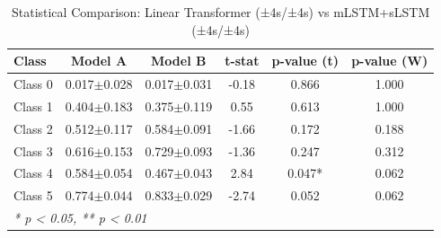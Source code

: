 \begin{table}[htbp]
\centering
\caption{Statistical Comparison: Linear Transformer (±4s/±4s) vs mLSTM+sLSTM (±4s/±4s)}
\label{tab:comparison_class_linear_transformer_±4s_±4s_vs_mlstmslstm_±4s_±4s}
\begin{tabular}{lccccc}
\toprule
\textbf{Class} & \textbf{Model A} & \textbf{Model B} & \textbf{t-stat} & \textbf{p-value (t)} & \textbf{p-value (W)} \\
\midrule
Class 0 & 0.017$\pm$0.028 & 0.017$\pm$0.031 & -0.18 & 0.866 & 1.000 \\
Class 1 & 0.404$\pm$0.183 & 0.375$\pm$0.119 & 0.55 & 0.613 & 1.000 \\
Class 2 & 0.512$\pm$0.117 & 0.584$\pm$0.091 & -1.66 & 0.172 & 0.188 \\
Class 3 & 0.616$\pm$0.153 & 0.729$\pm$0.093 & -1.36 & 0.247 & 0.312 \\
Class 4 & 0.584$\pm$0.054 & 0.467$\pm$0.043 & 2.84 & 0.047* & 0.062 \\
Class 5 & 0.774$\pm$0.044 & 0.833$\pm$0.029 & -2.74 & 0.052 & 0.062 \\
\bottomrule
\multicolumn{6}{l}{\textit{* p < 0.05, ** p < 0.01}} \\
\end{tabular}
\end{table}